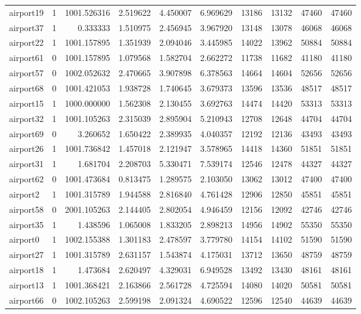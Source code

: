 \begin{longtable}{|l|r|r|r|r|r|r|r|r|r|}
airport19 & 1 & 1001.526316 & 2.519622 & 4.450007 & 6.969629 & 13186 & 13132 & 47460 & 47460 \\
airport37 & 1 & 0.333333 & 1.510975 & 2.456945 & 3.967920 & 13148 & 13078 & 46068 & 46068 \\
airport22 & 1 & 1001.157895 & 1.351939 & 2.094046 & 3.445985 & 14022 & 13962 & 50884 & 50884 \\
airport61 & 0 & 1001.157895 & 1.079568 & 1.582704 & 2.662272 & 11738 & 11682 & 41180 & 41180 \\
airport57 & 0 & 1002.052632 & 2.470665 & 3.907898 & 6.378563 & 14664 & 14604 & 52656 & 52656 \\
airport68 & 0 & 1001.421053 & 1.938728 & 1.740645 & 3.679373 & 13596 & 13536 & 48517 & 48517 \\
airport15 & 1 & 1000.000000 & 1.562308 & 2.130455 & 3.692763 & 14474 & 14420 & 53313 & 53313 \\
airport32 & 1 & 1001.105263 & 2.315039 & 2.895904 & 5.210943 & 12708 & 12648 & 44704 & 44704 \\
airport69 & 0 & 3.260652 & 1.650422 & 2.389935 & 4.040357 & 12192 & 12136 & 43493 & 43493 \\
airport26 & 1 & 1001.736842 & 1.457018 & 2.121947 & 3.578965 & 14418 & 14360 & 51851 & 51851 \\
airport31 & 1 & 1.681704 & 2.208703 & 5.330471 & 7.539174 & 12546 & 12478 & 44327 & 44327 \\
airport62 & 0 & 1001.473684 & 0.813475 & 1.289575 & 2.103050 & 13062 & 13012 & 47400 & 47400 \\
airport2 & 1 & 1001.315789 & 1.944588 & 2.816840 & 4.761428 & 12906 & 12850 & 45851 & 45851 \\
airport58 & 0 & 2001.105263 & 2.144405 & 2.802054 & 4.946459 & 12156 & 12092 & 42746 & 42746 \\
airport35 & 1 & 1.438596 & 1.065008 & 1.833205 & 2.898213 & 14956 & 14902 & 55350 & 55350 \\
airport0 & 1 & 1002.155388 & 1.301183 & 2.478597 & 3.779780 & 14154 & 14102 & 51590 & 51590 \\
airport27 & 1 & 1001.315789 & 2.631157 & 1.543874 & 4.175031 & 13712 & 13650 & 48759 & 48759 \\
airport18 & 1 & 1.473684 & 2.620497 & 4.329031 & 6.949528 & 13492 & 13430 & 48161 & 48161 \\
airport13 & 1 & 1001.368421 & 2.163866 & 2.561728 & 4.725594 & 14080 & 14020 & 50581 & 50581 \\
airport66 & 0 & 1002.105263 & 2.599198 & 2.091324 & 4.690522 & 12596 & 12540 & 44639 & 44639 \\

\end{longtable}
